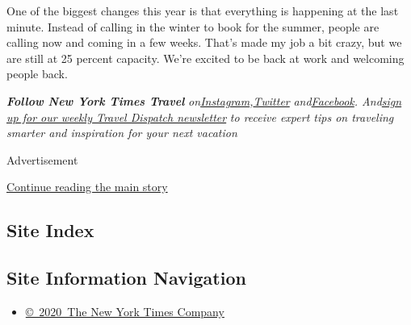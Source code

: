 One of the biggest changes this year is that everything is happening at
the last minute. Instead of calling in the winter to book for the
summer, people are calling now and coming in a few weeks. That's made my
job a bit crazy, but we are still at 25 percent capacity. We're excited
to be back at work and welcoming people back.

\emph{\textbf{Follow New York Times Travel}}
\emph{on}\href{https://www.instagram.com/nytimestravel/}{\emph{Instagram}}\emph{,}\href{https://twitter.com/nytimestravel}{\emph{Twitter}}
\emph{and}\href{https://www.facebook.com/nytimestravel/}{\emph{Facebook}}\emph{.
And}\href{https://www.nytimes.com/newsletters/traveldispatch}{\emph{sign
up for our weekly Travel Dispatch newsletter}} \emph{to receive expert
tips on traveling smarter and inspiration for your next vacation}

Advertisement

\protect\hyperlink{after-bottom}{Continue reading the main story}

\hypertarget{site-index}{%
\subsection{Site Index}\label{site-index}}

\hypertarget{site-information-navigation}{%
\subsection{Site Information
Navigation}\label{site-information-navigation}}

\begin{itemize}
\tightlist
\item
  \href{https://help.nytimes.com/hc/en-us/articles/115014792127-Copyright-notice}{©~2020~The
  New York Times Company}
\end{itemize}

